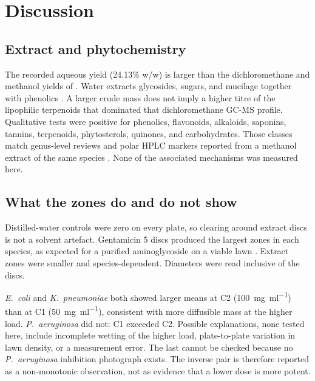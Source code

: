 
\chapter{Discussion}
\label{ch:discussion}

\section{Extract and phytochemistry}
\label{sec:disc_yield}

The recorded aqueous yield (24.13\% w/w) is larger than the dichloromethane and methanol yields of \citet{drakhshaan2026}. Water extracts glycosides, sugars, and mucilage together with phenolics \citep{cowan1999}. A larger crude mass does not imply a higher titre of the lipophilic terpenoids that dominated that dichloromethane GC-MS profile. Qualitative tests were positive for phenolics, flavonoids, alkaloids, saponins, tannins, terpenoids, phytosterols, quinones, and carbohydrates. Those classes match genus-level reviews \citep{zhao2011,skala2023} and polar HPLC markers reported from a methanol extract of the same species \citep{drakhshaan2026}. None of the associated mechanisms was measured here.

\section{What the zones do and do not show}
\label{sec:disc_antibacterial}

Distilled-water controls were zero on every plate, so clearing around extract discs is not a solvent artefact. Gentamicin 5 discs produced the largest zones in each species, as expected for a purified aminoglycoside on a viable lawn \citep{bauer1966,clsi2024}. Extract zones were smaller and species-dependent. Diameters were read inclusive of the discs.

\textit{E.\ coli} and \textit{K.\ pneumoniae} both showed larger means at C2 (\qty{100}{\milli\gram\per\milli\litre}) than at C1 (\qty{50}{\milli\gram\per\milli\litre}), consistent with more diffusible mass at the higher load. \textit{P.\ aeruginosa} did not: C1 exceeded C2. Possible explanations, none tested here, include incomplete wetting of the higher load, plate-to-plate variation in lawn density, or a measurement error. The last cannot be checked because no \textit{P.\ aeruginosa} inhibition photograph exists. The inverse pair is therefore reported as a non-monotonic observation, not as evidence that a lower dose is more potent.

